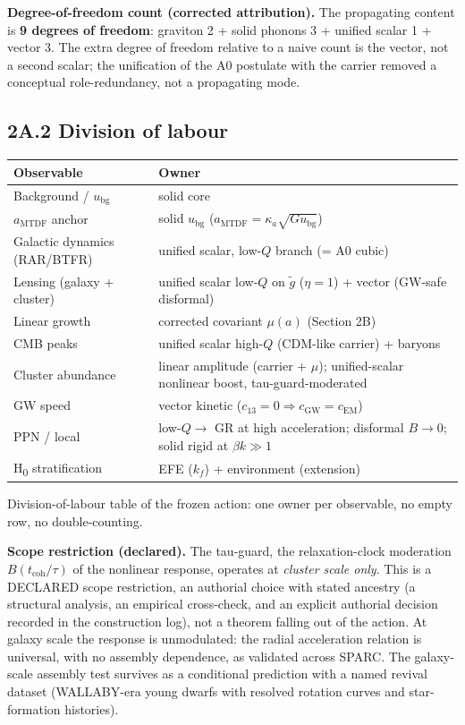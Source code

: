 \documentclass[11pt,a4paper]{article}
\begin{document}
\textbf{Degree-of-freedom count (corrected attribution).} The propagating content is \textbf{9 degrees of freedom}: graviton 2 + solid phonons 3 + unified scalar 1 + vector 3. The extra degree of freedom relative to a naive count is the vector, not a second scalar; the unification of the A0 postulate with the carrier removed a conceptual role-redundancy, not a propagating mode.

\subsection*{2A.2 Division of labour}

\begin{table}[H]
\centering
\footnotesize
\begin{tabularx}{\linewidth}{>{\RaggedRight\arraybackslash}X>{\RaggedRight\arraybackslash}X}
\toprule
\textbf{Observable} & \textbf{Owner} \tabularnewline
\midrule
Background / \(u_{\mathrm{bg}}\) & solid core \tabularnewline
\(a_{\mathrm{MTDF}}\) anchor & solid \(u_{\mathrm{bg}}\) (\(a_{\mathrm{MTDF}} = \kappa_a\sqrt{G u_{\mathrm{bg}}}\)) \tabularnewline
Galactic dynamics (RAR/\allowbreak{}BTFR) & unified scalar, low-\(Q\) branch (= A0 cubic) \tabularnewline
Lensing (galaxy + cluster) & unified scalar low-\(Q\) on \(\tilde{g}\) (\(\eta=1\)) + vector (GW-safe disformal) \tabularnewline
Linear growth & corrected covariant \(\mu(a)\) (Section 2B) \tabularnewline
CMB peaks & unified scalar high-\(Q\) (CDM-like carrier) + baryons \tabularnewline
Cluster abundance & linear amplitude (carrier + \(\mu\)); unified-scalar nonlinear boost, tau-guard-moderated \tabularnewline
GW speed & vector kinetic (\(c_{13}=0 \Rightarrow c_{\mathrm{GW}}=c_{\mathrm{EM}}\)) \tabularnewline
PPN / local & low-\(Q \to\) GR at high acceleration; disformal \(B\to 0\); solid rigid at \(\beta k \gg 1\) \tabularnewline
H\textsubscript{0} stratification & EFE (\(k_f\)) + environment (extension) \tabularnewline
\bottomrule
\end{tabularx}
\end{table}

Division-of-labour table of the frozen action: one owner per observable, no empty row, no double-counting.

\textbf{Scope restriction (declared).} The tau-guard, the relaxation-clock moderation \(B(t_{\mathrm{coh}}/\tau)\) of the nonlinear response, operates at \emph{cluster scale only}. This is a DECLARED scope restriction, an authorial choice with stated ancestry (a structural analysis, an empirical cross-check, and an explicit authorial decision recorded in the construction log), not a theorem falling out of the action. At galaxy scale the response is unmodulated: the radial acceleration relation is universal, with no assembly dependence, as validated across SPARC. The galaxy-scale assembly test survives as a conditional prediction with a named revival dataset (WALLABY-era young dwarfs with resolved rotation curves and star-formation histories).
\end{document}
